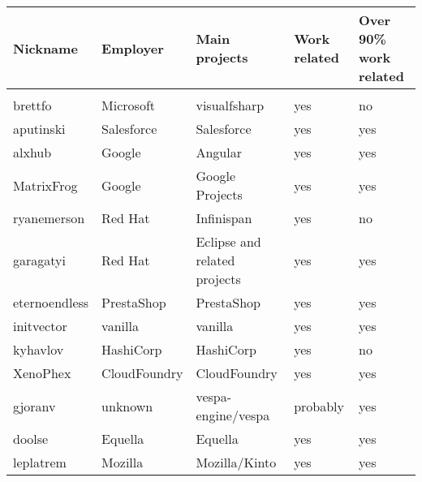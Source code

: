 \begin{landscape}
    \begin{table}[]
        \centering
        \label{tbl:employee-cluster-evaluation}
        \begin{tabular}{lllll}
            \toprule
            Nickname      & Employer     & Main projects                & Work related & Over 90\% work related \\
            \midrule
                          &              &                              &              &                        \\
            brettfo       & Microsoft    & visualfsharp                 & yes          & no                     \\
            aputinski     & Salesforce   & Salesforce                   & yes          & yes                    \\
            alxhub        & Google       & Angular                      & yes          & yes                    \\
            MatrixFrog    & Google       & Google Projects              & yes          & yes                    \\
            ryanemerson   & Red Hat      & Infinispan                   & yes          & no                     \\
            garagatyi     & Red Hat      & Eclipse and related projects & yes          & yes                    \\
            eternoendless & PrestaShop   & PrestaShop                   & yes          & yes                    \\
            initvector    & vanilla      & vanilla                      & yes          & yes                    \\
            kyhavlov      & HashiCorp    & HashiCorp                    & yes          & no                     \\
            XenoPhex      & CloudFoundry & CloudFoundry                 & yes          & yes                    \\
            gjoranv       & unknown      & vespa-engine/vespa           & probably     & yes                    \\
            doolse        & Equella      & Equella                      & yes          & yes                    \\
            leplatrem     & Mozilla      & Mozilla/Kinto                & yes          & yes                    \\

\end{tabular}
\end{table}
\end{landscape}
